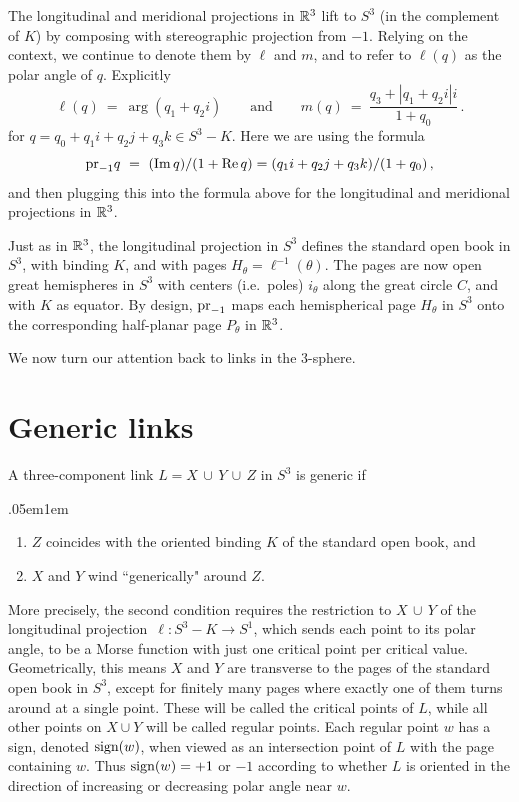 \break

The longitudinal and meridional projections  in $\mathbb R^3$ lift to $S^3$ \label{longproj} (in the complement of $K$) by composing with stereographic projection from $-1$.  Relying on the context, we continue to denote them by $\ell$ and $m$, and to refer to $\ell(q)$ as the polar angle of $q$.  Explicitly
$$
\ell(q) \ = \ \arg(q_1+q_2i)\qquad\text{and}\qquad m(q) \ = \ \frac{q_3 + |q_1+q_2i|i}{1+q_0}\,.
$$
for $q = q_0+q_1i+q_2j+q_3k\in S^3-K$.  Here we are using 
the formula 
$$
\pr_{-1}q \ =  \ (\Im q) / (1 + \re q)  =  (q_1 i + q_2 j + q_3 k) / (1 + q_0)\,,
$$
and then plugging this into the formula above for the longitudinal and meridional projections in $\mathbb R^3$.  

Just as in $\mathbb R^3$, the longitudinal projection in $S^3$ defines the {\itb standard open book} in $S^3$, with binding $K$, and with pages $H_\theta = \ell^{-1}(\theta)$.  The pages are now open great hemispheres  in $S^3$ with centers (i.e.\ poles) $i_\theta$ along the great circle $C$, and with $K$ as equator.  By design, $\mathrm{pr}_{-1}$ maps each hemispherical page $H_\theta$ in $S^3$ onto the corresponding half-planar page $P_\theta$ in $\mathbb R^3$.   


We now turn our attention back to links in the $3$-sphere. 


\part{Generic links}

A three-component link $L=X\,\cup\,Y\,\cup\,Z$ in $S^3$ is {\itb generic} if

\vspace{.02in}
\begin{indentation}{.05em}{1em}
\begin{enumerate}
\item $Z$ coincides with the oriented binding $K$ of the standard open book, and
\smallskip
\item $X$ and $Y$ wind ``generically" around $Z$.
\end{enumerate}  
\end{indentation}
\vspace{.02in}

More precisely, the second condition requires the restriction to $X\,\cup\,Y$ of the longitudinal projection \,$\ell:S^3-K\longrightarrow S^1$, which sends each point to its polar angle, to be a Morse function with just one critical point per critical value.  Geometrically, this means $X$ and $Y$ are transverse to the pages of the standard open book in $S^3$, except for finitely many pages where exactly one of them turns around at a single point.   These will be called the {\itb critical points} of $L$, while all other points on $X\cup Y$ will be called {\itb regular points}.   Each regular point $w$ has a sign, denoted {\bf\boldmath $\textup{sign}(w)$}, when viewed as an intersection point of $L$ with the page containing $w$.  Thus $\textup{sign}(w) = +1$ or $-1$ according to whether $L$ is oriented in the direction of increasing or decreasing polar angle near $w$.  

